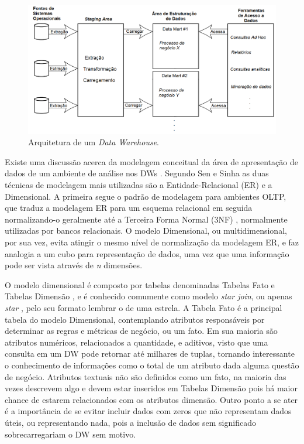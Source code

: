 \begin{figure}[htpb]
	\centering
		\includegraphics[width=\textwidth]{img/dw_arc}
	\caption{Arquitetura de um \textit{Data Warehouse}.}
	\label{fig:dw_arq}
\end{figure}

Existe uma discussão acerca da modelagem conceitual da área de apresentação de dados de um ambiente de análise nos DWs \cite{sen2005comparison}. Segundo Sen e Sinha \cite{sen2005comparison} as duas técnicas de modelagem mais utilizadas são a Entidade-Relacional (ER) e a Dimensional. A primeira segue o padrão de modelagem para ambientes OLTP, que traduz a modelagem ER para um esquema relacional em seguida normalizando-o geralmente até a Terceira Forma Normal (3NF) \cite{kimball2002dw}, normalmente utilizadas por bancos relacionais. O modelo Dimensional, ou multidimensional, por sua vez, evita atingir o mesmo nível de normalização da modelagem ER, e faz analogia a um cubo para representação de dados, uma vez que uma informação pode ser vista através de \textit{n} dimensões. 

O modelo dimensional é composto por tabelas denominadas Tabelas Fato e Tabelas Dimensão \cite{kimball2002dw}, e é conhecido comumente como modelo \textit{star join}, ou apenas \textit{star} \cite{sen2005comparison}, pelo seu formato lembrar o de uma estrela. A Tabela Fato é a principal tabela do modelo Dimensional, contemplando atributos responsáveis por determinar as regras e métricas de negócio, ou um fato. Em sua maioria são atributos numéricos, relacionados a quantidade, e aditivos, visto que uma consulta em um DW pode retornar até milhares de tuplas, tornando interessante o conhecimento de informações como o total de um atributo dada alguma questão de negócio. Atributos textuais não são definidos como um fato, na maioria das vezes descrevem algo e devem estar inseridos em Tabelas Dimensão pois há maior chance de estarem relacionados com os atributos dimensão. Outro ponto a se ater é a importância de se evitar incluir dados com zeros que não representam dados úteis, ou representando nada, pois a inclusão de dados sem significado sobrecarregariam o DW sem motivo.

